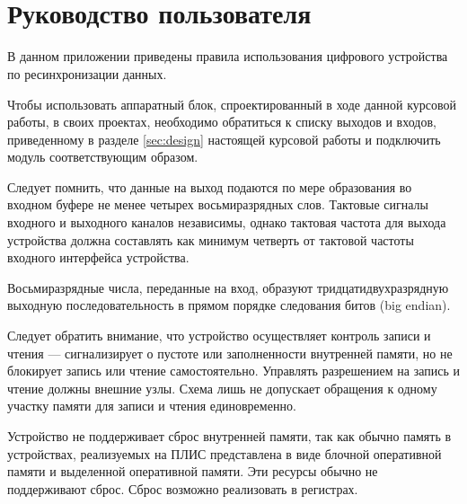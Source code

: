 \chapter{\\\hspace{-6mm}Руководство пользователя}
\label{cha:appendix3}
\setlength{\parindent}{12.5mm}

В данном приложении приведены правила использования цифрового устройства по ресинхронизации данных. 

Чтобы использовать аппаратный блок, спроектированный в ходе данной курсовой работы, в своих проектах, необходимо обратиться к списку выходов и входов, приведенному в разделе \ref{sec:design} настоящей курсовой работы и подключить модуль соответствующим образом.

Следует помнить, что данные на выход подаются по мере образования во входном буфере не менее четырех восьмиразрядных слов. Тактовые сигналы входного и выходного каналов независимы, однако тактовая частота для выхода устройства должна составлять как минимум  четверть от тактовой частоты входного интерфейса устройства.

Восьмиразрядные числа, переданные на вход, образуют тридцатидвухразрядную выходную последовательность в прямом порядке следования битов (big endian). 

Следует обратить внимание, что устройство осуществляет контроль записи и чтения --- сигнализирует о пустоте или заполненности внутренней памяти, но не блокирует запись или чтение самостоятельно. Управлять разрешением на запись и чтение должны внешние узлы. Схема лишь не допускает обращения к одному участку памяти для записи и чтения единовременно.

Устройство не поддерживает сброс внутренней памяти, так как обычно память в устройствах, реализуемых на ПЛИС представлена в виде блочной оперативной памяти и выделенной оперативной памяти. Эти ресурсы обычно не поддерживают сброс. Сброс возможно реализовать в регистрах. 


